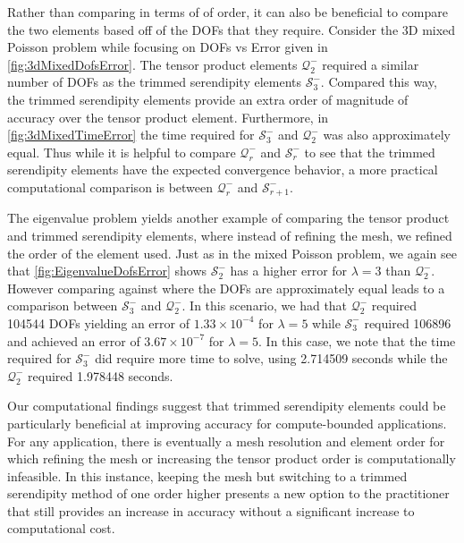 \documentclass[format=acmsmall,screen,timestamp=false,a4paper]{acmart}
\begin{document}
Rather than comparing in terms of of order, it can also be beneficial to compare the two elements based off of the DOFs that they require.  Consider the 3D mixed Poisson problem while focusing on DOFs vs Error given in \cref{fig:3dMixedDofsError}.  The tensor product elements $\mathcal{Q}^-_2$ required a similar number of DOFs as the trimmed serendipity elements $\mathcal{S}^-_3$.  Compared this way, the trimmed serendipity elements provide an extra order of magnitude of accuracy over the tensor product element.  Furthermore, in \cref{fig:3dMixedTimeError} the time required for $\mathcal{S}^-_3$ and $\mathcal{Q}^-_2$ was also approximately equal.   Thus while it is helpful to compare $\mathcal{Q}^-_r$ and $\mathcal{S}^-_r$ to see that the trimmed serendipity elements have the expected convergence behavior, a more practical computational comparison is between $\mathcal{Q}^-_r$ and $\mathcal{S}_{r+1}^-$.  

The eigenvalue problem yields another example of comparing the tensor product and trimmed serendipity elements, where instead of refining the mesh, we  refined the order of the element used.  Just as in the mixed Poisson problem, we again see that \cref{fig:EigenvalueDofsError} shows $\mathcal{S}^-_2$ has a higher error for $\lambda = 3$ than $\mathcal{Q}^-_2$.  However comparing against where the DOFs are approximately equal leads to a comparison between $\mathcal{S}^-_3$ and $\mathcal{Q}^-_2$.  In this scenario, we had that $\mathcal{Q}^-_2$ required 104544 DOFs yielding an error of $1.33 \times 10^{-4}$ for $\lambda = 5$ while $\mathcal{S}^-_3$ required 106896 and achieved an error of $3.67 \times 10^{-7}$ for $\lambda = 5$.  In this case, we note that the time required for $\mathcal{S}^-_3$ did require more time to solve, using 2.714509 seconds while the $\mathcal{Q}^-_2$ required 1.978448 seconds.


Our computational findings suggest that trimmed serendipity elements could be particularly beneficial at improving accuracy for compute-bounded applications.  For any application, there is eventually a mesh resolution and element order for which refining the mesh or increasing the tensor product order is computationally infeasible.  In this instance, keeping the mesh but switching to a trimmed serendipity method of one order higher presents a new option to the practitioner that still provides an increase in accuracy without a significant increase to computational cost.


\end{document}
